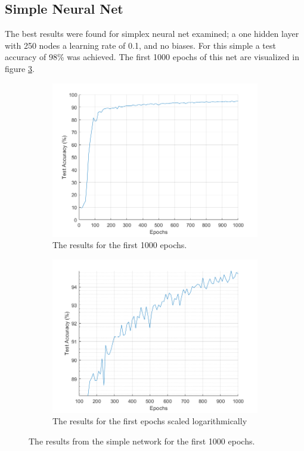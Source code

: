 \documentclass[12pt]{article}
\begin{document}
	\subsection{Simple Neural Net}
	The best results were found for simplex neural net examined; a one hidden layer with 250 nodes a learning rate of 0.1, and no biases. For this simple a test accuracy of 98\% was achieved. The first 1000 epochs of this net are visualized in figure \ref{fig:250_all}.
	\begin{figure}
		\centering
		\begin{subfigure}{.5\textwidth}
			\centering
			\includegraphics[width=\linewidth]{250_results}
			\caption{The results for the first 1000 epochs.}
			\label{fig:250results}
		\end{subfigure}%
		\begin{subfigure}{.5\textwidth}
			\centering
			\includegraphics[width=\linewidth]{250_results_log}
			\caption{The results for the first epochs scaled logarithmically}
			\label{fig:250resultslog}
		\end{subfigure}
		\caption{The results from the simple network for the first 1000 epochs.}
		\label{fig:250_all}
	\end{figure}
\end{document}

